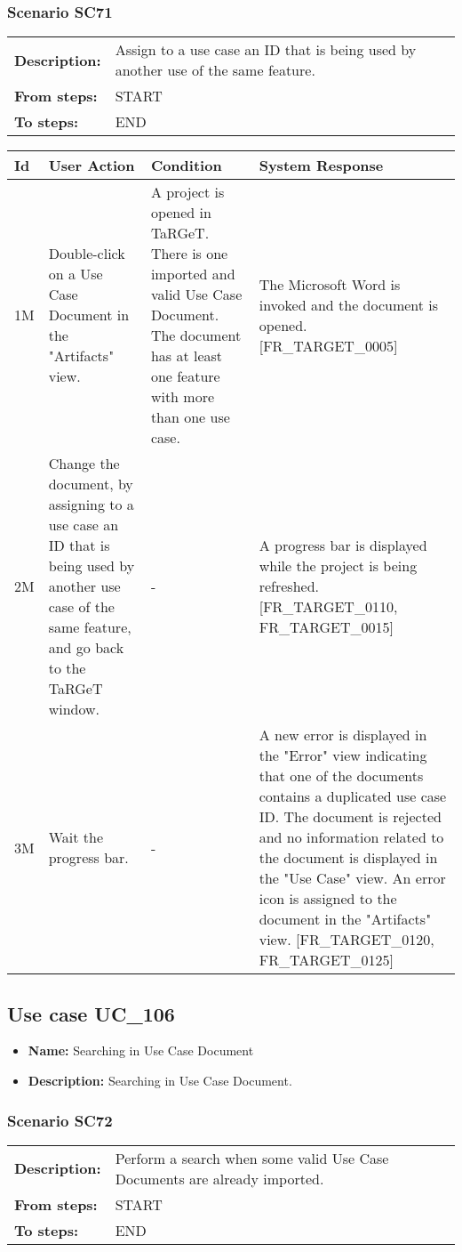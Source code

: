 \documentclass[a4paper,11pt]{article}
\newcommand{\bl}{\\ \hline}
\begin{document}
\subsubsection*{Scenario SC71}
\begin{tabular}{p{1in}p{4in}}
{\bf Description:} & Assign to a use case an ID that is being used by
					another use of the same feature. \\
{\bf From steps:} & START \\
{\bf To steps:} & END \\
\end{tabular}
 
\begin{tabular}{|p{0.8in}|p{1.6in}|p{1.6in}|p{1.6in}|}
\hline
Id & User Action & Condition & System Response  \bl 
1M & Double-click on a Use Case Document in the "Artifacts"
						view. & A project is opened in TaRGeT. There is one imported and
						valid Use Case Document. The document has at least one feature
						with more than one use case. & The Microsoft Word is invoked and the document is opened.
						[FR_TARGET_0005] \bl 
2M & Change the document, by assigning to a use case an ID that
						is being used by another use case of the same feature, and go back
						to the TaRGeT window.  & - & A progress bar is displayed while the project is being
						refreshed. [FR_TARGET_0110, FR_TARGET_0015] \bl 
3M & Wait the progress bar. & - & A new error is displayed in the "Error" view indicating
						that one of the documents contains a duplicated use case ID. The
						document is rejected and no information related to the document is
						displayed in the "Use Case" view. An error icon is assigned to the
						document in the "Artifacts" view. [FR_TARGET_0120, FR_TARGET_0125]
					 \bl 
\end{tabular}
\subsection*{Use case UC_106}
\begin{itemize}
\item {\bf Name: }Searching in Use Case Document
\item {\bf Description: }Searching in Use Case Document.
\end{itemize}
\subsubsection*{Scenario SC72}
\begin{tabular}{p{1in}p{4in}}
{\bf Description:} & Perform a search when some valid Use Case Documents are
					already imported. \\
{\bf From steps:} & START \\
{\bf To steps:} & END \\
\end{tabular}
 
\end{document}
